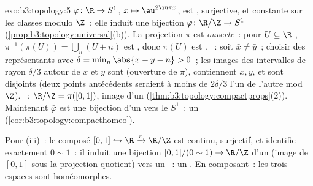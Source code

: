 \begin{solution}{exo:b3:topology:5}
$\varphi \colon \R \to S^1$, $x \mapsto \eu^{2\iu\pi x}$, est
, surjective, et constante sur les classes modulo
$\Z$~: elle induit une bijection  $\bar\varphi \colon
\R/\Z \to S^1$ (\cref{prop:b3:topology:universal}(b)). La
projection $\pi$ est \emph{ouverte}~: pour $U \subseteq \R$
, $\pi^{-1}(\pi(U)) = \bigcup_{n}(U + n)$ est ,
donc $\pi(U)$ est . ~: soit $\bar x \neq \bar
y$~; choisir des représentants avec $\delta =
\min_{n}\abs{x - y - n} > 0$~; les images des intervalles de
rayon $\delta/3$ autour de $x$ et $y$ sont 
(ouverture de $\pi$), contiennent $\bar x, \bar y$, et sont
disjoints (deux points antécédents seraient à moins de
$2\delta/3$ l'un de l'autre mod $\Z$). ~: $\R/\Z =
\pi([0,1])$, image  d'un 
(\cref{thm:b3:topology:compactprops}(2)). Maintenant
$\bar\varphi$ est une bijection  d'un 
vers le  $S^1$~: un 
(\cref{cor:b3:topology:compacthomeo}).

Pour (iii)~: le composé $[0,1] \hookrightarrow \R
\xrightarrow{\pi} \R/\Z$ est continu, surjectif, et identifie
exactement $0 \sim 1$~: il induit une bijection 
$[0,1]/(0\sim1) \to \R/\Z$ d'un  (image 
de $[0,1]$ sous la projection quotient) vers un ~: un . En composant~: les trois espaces
sont homéomorphes.
\end{solution}


